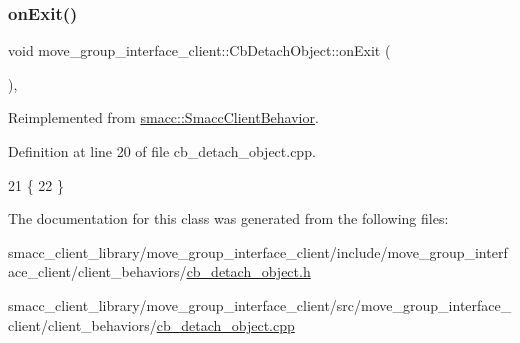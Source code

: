 \subsubsection{\texorpdfstring{on\+Exit()}{onExit()}}
{\footnotesize\ttfamily void move\+\_\+group\+\_\+interface\+\_\+client\+::\+Cb\+Detach\+Object\+::on\+Exit (\begin{DoxyParamCaption}{ }\end{DoxyParamCaption})\hspace{0.3cm}{\ttfamily [override]}, {\ttfamily [virtual]}}



Reimplemented from \hyperlink{classsmacc_1_1SmaccClientBehavior_ac0cd72d42bd00425362a97c9803ecce5}{smacc\+::\+Smacc\+Client\+Behavior}.



Definition at line 20 of file cb\+\_\+detach\+\_\+object.\+cpp.


\begin{DoxyCode}
21     \{
22     \}
\end{DoxyCode}


The documentation for this class was generated from the following files\+:\begin{DoxyCompactItemize}
\item 
smacc\+\_\+client\+\_\+library/move\+\_\+group\+\_\+interface\+\_\+client/include/move\+\_\+group\+\_\+interface\+\_\+client/client\+\_\+behaviors/\hyperlink{cb__detach__object_8h}{cb\+\_\+detach\+\_\+object.\+h}\item 
smacc\+\_\+client\+\_\+library/move\+\_\+group\+\_\+interface\+\_\+client/src/move\+\_\+group\+\_\+interface\+\_\+client/client\+\_\+behaviors/\hyperlink{cb__detach__object_8cpp}{cb\+\_\+detach\+\_\+object.\+cpp}\end{DoxyCompactItemize}
